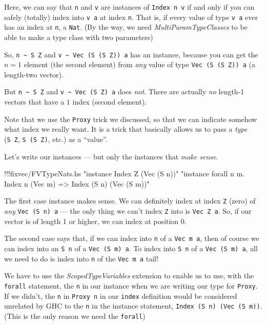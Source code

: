 \documentclass[]{article}
\newenvironment{Shaded}{}{}
\newcommand{\StringTok}[1]{\textcolor[rgb]{0.25,0.44,0.63}{{#1}}}
\newcommand{\FunctionTok}[1]{\textcolor[rgb]{0.02,0.16,0.49}{{#1}}}
\newcommand{\NormalTok}[1]{{#1}}
\begin{document}
Here, we can say that \texttt{n} and \texttt{v} are instances of
\texttt{Index\ n\ v} if and only if you can safely (totally) index into
\texttt{v\ a} at index \texttt{n}. That is, if every value of type
\texttt{v\ a} ever has an index at \texttt{n}, a \texttt{Nat}. (By the
way, we need \emph{MultiParamTypeClasses} to be able to make a type
class with two parameters)

So, \texttt{n\ \textasciitilde{}\ S\ Z} and
\texttt{v\ \textasciitilde{}\ Vec\ (S\ (S\ Z))\ a} has an instance,
because you can get the \(n = 1\) element (the second element) from
\emph{any} value of type \texttt{Vec\ (S\ (S\ Z))\ a} (a length-two
vector).

But \texttt{n\ \textasciitilde{}\ S\ Z} and
\texttt{v\ \textasciitilde{}\ Vec\ (S\ Z)\ a} does \emph{not}. There are
actually \emph{no} length-1 vectors that have a \(1\) index (second
element).

Note that we use the \texttt{Proxy} trick we discussed, so that we can
indicate somehow what index we really want. It is a trick that basically
allows us to pass a \emph{type} (\texttt{S\ Z}, \texttt{S\ (S\ Z)},
etc.) as a ``value''.

Let's write our instances --- but only the instances that \emph{make
sense}.

\begin{Shaded}
\begin{Highlighting}[]
\FunctionTok{!!!}\NormalTok{fixvec}\FunctionTok{/}\NormalTok{FVTypeNats.hs }\StringTok{"instance Index Z (Vec (S n))"} \StringTok{"instance forall n m. Index n (Vec m) => Index (S n) (Vec (S m))"}
\end{Highlighting}
\end{Shaded}

The first case instance makes sense. We can definitely index at index
\texttt{Z} (zero) of \emph{any} \texttt{Vec\ (S\ n)\ a} --- the only
thing we can't index \texttt{Z} into is \texttt{Vec\ Z\ a}. So, if our
vector is of length 1 or higher, we can index at position 0.

The second case says that, if we can index into \texttt{n} of a
\texttt{Vec\ m\ a}, then of course we can index into an \texttt{S\ n} of
a \texttt{Vec\ (S\ m)\ a}. To index into \texttt{S\ n} of a
\texttt{Vec\ (S\ m)\ a}, all we need to do is index into \texttt{n} of
the \texttt{Vec\ m\ a} tail!

We have to use the \emph{ScopedTypeVariables} extension to enable us to
use, with the \texttt{forall} statement, the \texttt{n} in our instance
when we are writing our type for \texttt{Proxy}. If we didn't, the
\texttt{n} in \texttt{Proxy\ n} in our \texttt{index} definition would
be considered unrelated by GHC to the \texttt{n} in the instance
statement, \texttt{Index\ (S\ n)\ (Vec\ (S\ m))}. (This is the only
reason we need the \texttt{forall})
\end{document}

